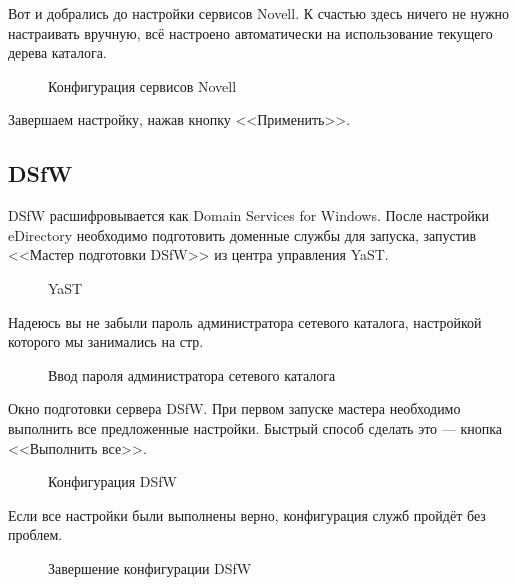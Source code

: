 Вот и добрались до настройки сервисов Novell. К счастью здесь ничего не нужно настраивать вручную, всё настроено автоматически на использование текущего дерева каталога.
\begin{figure}[H]
\caption{Конфигурация сервисов Novell}
\end{figure}
Завершаем настройку, нажав кнопку <<Применить>>.
\clearpage

\subsection{DSfW}
DSfW расшифровывается как Domain Services for Windows. После настройки eDirectory необходимо подготовить доменные службы для запуска, запустив <<Мастер подготовки DSfW>> из центра управления YaST.
\begin{figure}[H]
\caption{YaST}
\end{figure}
\clearpage

Надеюсь вы не забыли пароль администратора сетевого каталога, настройкой которого мы занимались на стр.~\pageref{sec:eDirpass}
\begin{figure}[H]
\caption{Ввод пароля администратора сетевого каталога}
\end{figure}
\clearpage

Окно подготовки сервера DSfW. При первом запуске мастера необходимо выполнить все предложенные настройки. Быстрый способ сделать это --- кнопка <<Выполнить все>>.
\begin{figure}[H]
\caption{Конфигурация DSfW}
\end{figure}
\clearpage

Если все настройки были выполнены верно, конфигурация служб пройдёт без проблем.
\begin{figure}[H]
\caption{Завершение конфигурации DSfW}
\end{figure}
\clearpage

